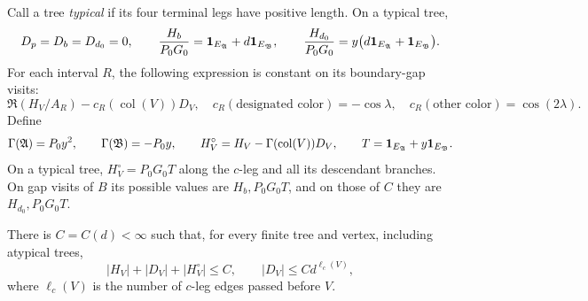 \begin{lemma}
\label{lem:obs-marked}
Call a tree \emph{typical} if its four terminal legs have positive
length.  On a typical tree,
\begin{equation}
 D_p=D_b=D_{d_0}=0,\qquad
 \frac{H_b}{P_0G_0}=\mathbf 1_{E_{\mathfrak A}}+d\mathbf 1_{E_{\mathfrak B}},
 \qquad
 \frac{H_{d_0}}{P_0G_0}
 =y\bigl(d\mathbf 1_{E_{\mathfrak A}}+\mathbf 1_{E_{\mathfrak B}}\bigr).
 \label{obs:marked-values}
\end{equation}
For each interval $R$, the following expression is constant on its
boundary-gap visits:
\begin{equation}
 \Re(H_V/A_R)-c_R(\operatorname{col}(V))D_V,
 \quad
 c_R(\text{designated color})=-\cos\lambda,
 \quad c_R(\text{other color})=\cos(2\lambda).
 \label{obs:line-invariant}
\end{equation}
Define
\begin{equation}
 \Gamma(\mathfrak A)=P_0y^2,\qquad
 \Gamma(\mathfrak B)=-P_0y,\qquad
 H_V^\circ=H_V-\Gamma(\operatorname{col}(V))D_V,
 \qquad T=\mathbf 1_{E_{\mathfrak A}}+y\mathbf 1_{E_{\mathfrak B}}.
 \label{obs:corrected}
\end{equation}
On a typical tree, $H_V^\circ=P_0G_0T$ along the $c$-leg and all
its descendant branches.  On gap visits of $B$ its possible values
are $H_b,P_0G_0T$, and on those of $C$ they are $H_{d_0},P_0G_0T$.

There is $C=C(d)<\infty$ such that, for every finite tree and vertex,
including atypical trees,
\begin{equation}
 |H_V|+|D_V|+|H_V^\circ|\le C,
 \qquad |D_V|\le C d^{\ell_c(V)},
 \label{obs:uniform-bound}
\end{equation}
where $\ell_c(V)$ is the number of $c$-leg edges passed before $V$.
\end{lemma}


